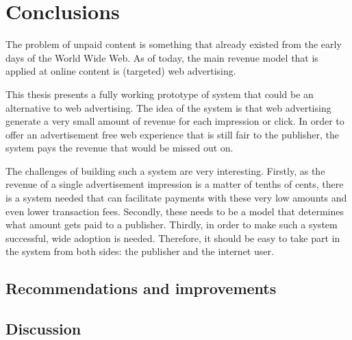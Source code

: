 \chapter{Conclusions}
\label{cha:conclusion}

The problem of unpaid content is something that already existed from the early days of the World Wide Web. As of today, the main revenue model that is applied at online content is (targeted) web advertising.

This thesis presents a fully working prototype of system that could be an alternative to web advertising. The idea of the system is that web advertising generate a very small amount of revenue for each impression or click. In order to offer an advertisement free web experience that is still fair to the publisher, the system pays the revenue that would be missed out on. 

The challenges of building such a system are very interesting. Firstly, as the revenue of a single advertisement impression is a matter of tenths of cents, there is a system needed that can facilitate payments with these very low amounts and even lower transaction fees. Secondly, these needs to be a model that determines what amount gets paid to a publisher. Thirdly, in order to make such a system successful, wide adoption is needed. Therefore, it should be easy to take part in the system from both sides: the publisher and the internet user. 





% 

\section{Recommendations and improvements}

\section{Discussion}
